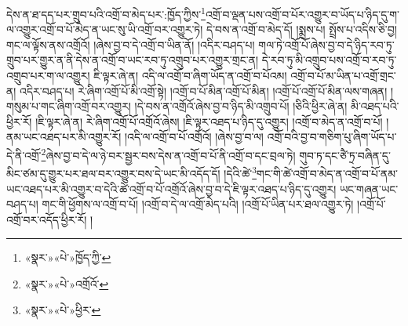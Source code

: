 དེས་ན་ཐ་དད་པར་གྲུབ་པའི་འགྲོ་བ་མེད་པར་:ཁྱོད་ཀྱིས་\footnote{«སྣར་»«པེ་»ཁྱོད་ཀྱི་}འགྲོ་བ་ལྡན་པས་འགྲོ་བ་པོར་འགྱུར་བ་ཡོད་པ་ཉིད་དུ་ག་ལ་འགྱུར་འགྲོ་བ་པོ་མེད་ན་ཡང་སུ་ཡི་འགྲོ་བར་འགྱུར་ཏེ། དེ་བས་ན་འགྲོ་བ་མེད་དོ། །སྨྲས་པ། སྤྲོས་པ་འདིས་ཅི་བྱ། གང་ལ་ལྟོས་ནས་འགྲོའོ། །ཞེས་བྱ་བ་དེ་འགྲོ་བ་ཡིན་ནོ། །འདིར་བཤད་པ། གལ་ཏེ་འགྲོ་པོ་ཞེས་བྱ་བ་དེ་ཉིད་རབ་ཏུ་གྲུབ་པར་གྱུར་ན་ནི་དེས་ན་འགྲོ་བ་ཡང་རབ་ཏུ་འགྲུབ་པར་འགྱུར་གྲང་ན། དེ་རབ་ཏུ་མི་འགྲུབ་པས་འགྲོ་བ་རབ་ཏུ་འགྲུབ་པར་ག་ལ་འགྱུར། ཇི་ལྟར་ཞེ་ན། འདི་ལ་འགྲོ་བ་ཞིག་ཡོད་ན་འགྲོ་བ་པོའམ། འགྲོ་བ་པོ་མ་ཡིན་པ་འགྲོ་གྲང་ན། འདིར་བཤད་པ། རེ་ཞིག་འགྲོ་པོ་མི་འགྲོ་སྟེ། །འགྲོ་བ་པོ་མིན་འགྲོ་པོ་མིན། །འགྲོ་པོ་འགྲོ་པོ་མིན་ལས་གཞན། །གསུམ་པ་གང་ཞིག་འགྲོ་བར་འགྱུར། །དེ་བས་ན་འགྲོའོ་ཞེས་བྱ་བ་ཉིད་མི་འགྲུབ་པོ། །ཅིའི་ཕྱིར་ཞེ་ན། མི་འཐད་པའི་ཕྱིར་རོ། །ཇི་ལྟར་ཞེ་ན། རེ་ཞིག་འགྲོ་པོ་འགྲོའོ་ཞེས། །ཇི་ལྟར་འཐད་པ་ཉིད་དུ་འགྱུར། །འགྲོ་བ་མེད་ན་འགྲོ་བ་པོ། །ནམ་ཡང་འཐད་པར་མི་འགྱུར་རོ། །འདི་ལ་འགྲོ་བ་པོ་འགྲོའོ། །ཞེས་བྱ་བ་ལ། འགྲོ་བའི་བྱ་བ་གཅིག་པུ་ཞིག་ཡོད་པ་དེ་ནི་འགྲོ་\footnote{«སྣར་»«པེ་»འགྲོའོ་}ཞེས་བྱ་བ་དེ་ལ་ཉེ་བར་སྦྱར་བས་དེས་ན་འགྲོ་བ་པོ་ནི་འགྲོ་བ་དང་བྲལ་ཏེ། གུབ་ཏ་དང་ཙཻ་ཏྲ་བཞིན་དུ་མིང་ཙམ་དུ་གྱུར་པར་ཐལ་བར་འགྱུར་བས་དེ་ཡང་མི་འདོད་དོ། །དེའི་ཚེ་\footnote{«སྣར་»«པེ་»ཕྱིར་}གང་གི་ཚེ་འགྲོ་བ་མེད་ན་འགྲོ་བ་པོ་ནམ་ཡང་འཐད་པར་མི་འགྱུར་བ་དེའི་ཚེ་འགྲོ་བ་པོ་འགྲོའོ་ཞེས་བྱ་བ་དེ་ཇི་ལྟར་འཐད་པ་ཉིད་དུ་འགྱུར། ཡང་གཞན་ཡང་བཤད་པ། གང་གི་ཕྱོགས་ལ་འགྲོ་བ་པོ། །འགྲོ་བ་དེ་ལ་འགྲོ་མེད་པའི། །འགྲོ་པོ་ཡིན་པར་ཐལ་འགྱུར་ཏེ། །འགྲོ་པོ་འགྲོ་བར་འདོད་ཕྱིར་རོ། །
